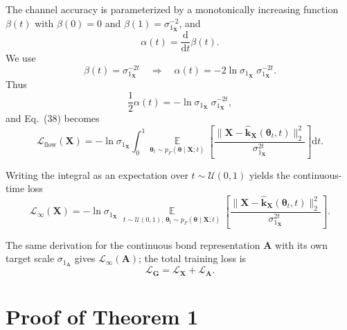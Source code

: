 \documentclass[numsec,webpdf,contemporary,large]{oup-authoring-template}%
\theoremstyle{thmstyleone}%
\theoremstyle{thmstyletwo}%
\theoremstyle{thmstylethree}%
\begin{document}
The channel accuracy is parameterized by a monotonically increasing function $\beta(t)$ with
$\beta(0)=0$ and $\beta(1)=\sigma_{1_\mathbf{X}}^{-2}$, and
\begin{equation}
\alpha(t) = \frac{\mathrm{d}}{\mathrm{d}t}\beta(t).
\end{equation}
We use
\begin{equation}
\beta(t) = \sigma_{1_\mathbf{X}}^{-2t}
\quad\Rightarrow\quad
\alpha(t)
=
- 2 \ln \sigma_{1_\mathbf{X}} \;\sigma_{1_\mathbf{X}}^{-2t}.
\end{equation}
Thus
\begin{equation}
\frac{1}{2}\alpha(t)
=
- \ln \sigma_{1_\mathbf{X}} \;\sigma_{1_\mathbf{X}}^{-2t},
\end{equation}
and Eq.~(38) becomes
\begin{equation}
\mathcal{L}_{\text{flow}}(\mathbf{X}) = 
- \ln \sigma_{1_\mathbf{X}}
\int_0^1
\mathop{\mathbb{E}}\limits_{\boldsymbol{\theta}_t \sim p_F(\boldsymbol{\theta}\mid \mathbf{X};t)}
\left[
    \frac{\big\| \mathbf{X} - \hat{\mathbf{k}}_{\mathbf{X}}(\boldsymbol{\theta}_t,t) \big\|_2^2}
         {\sigma_{1_\mathbf{X}}^{2t}}
\right]\mathrm{d}t.
\end{equation}



Writing the integral as an expectation over $t \sim \mathcal{U}(0,1)$ yields the continuous-time loss
\begin{equation}
\mathcal{L}_{\infty}(\mathbf{X}) = 
- \ln \sigma_{1_\mathbf{X}}\;
\mathop{\mathbb{E}}\limits_{t\sim\mathcal{U}(0,1),\,
           \boldsymbol{\theta}_t \sim p_F(\boldsymbol{\theta}\mid \mathbf{X};t)}
\left[
\frac{\|\mathbf{X}-\hat{\mathbf{k}}_{\mathbf{X}}(\boldsymbol{\theta}_t,t)\|_2^2}
     {\sigma_{1_\mathbf{X}}^{2t}}
\right].
\end{equation}

The same derivation for the continuous bond representation $\mathbf{A}$ with its own target scale
$\sigma_{1_\mathbf{A}}$ gives $\mathcal{L}_{\infty}(\mathbf{A})$; the total training loss is
\[
\mathcal{L}_{\mathbf{G}} = \mathcal{L}_{\mathbf{X}} + \mathcal{L}_{\mathbf{A}}.
\]


\section{Proof of Theorem 1}
\label{app:qw:edge_cost}
\end{document}
